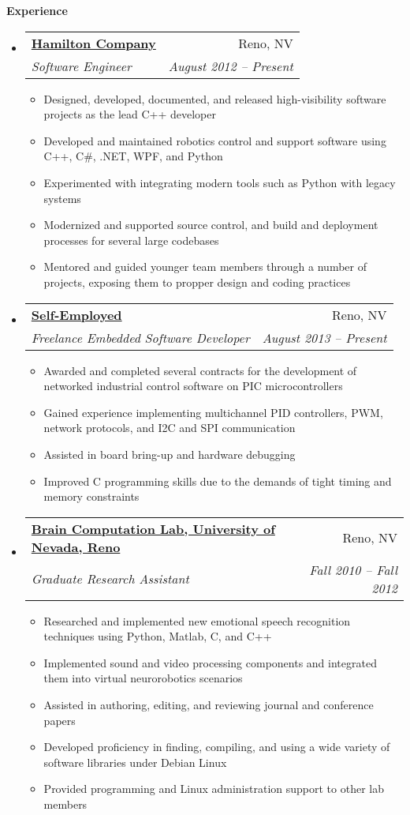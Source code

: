 \documentclass[letterpaper,11pt]{article}
\makeatletter
\newcommand{\resitem}[1]{\item #1 \vspace{-2pt}}
\newcommand{\resheading}[1]{{\large \colorbox{mygrey}{\begin{minipage}{\textwidth}{\textbf{#1 \vphantom{p\^{E}}}}\end{minipage}}}}
\newcommand{\ressubheading}[4]{
\begin{tabular*}{6.5in}{l@{\extracolsep{\fill}}r}
		\textbf{#1} & #2 \\
		\textit{#3} & \textit{#4} \\
\end{tabular*}\vspace{-6pt}}
\makeatother
\begin{document}
\resheading{Experience}
	\begin{itemize}
		\item 
			\ressubheading{\href{http://www.hamiltoncompany.com/}{Hamilton Company}}{Reno, NV}{Software Engineer}{August 2012 -- Present}
				{ \footnotesize
				\begin{itemize}
					\resitem{Designed, developed, documented, and released high-visibility software projects as the lead C++ developer}
					\resitem{Developed and maintained robotics control and support software using C++, C\#, .NET, WPF, and Python}
					\resitem{Experimented with integrating modern tools such as Python with legacy systems}
					\resitem{Modernized and supported source control, and build and deployment processes for several large codebases}
					\resitem{Mentored and guided younger team members through a number of projects, exposing them to propper design and coding practices}					
				\end{itemize}
				}		
				
		\item 
			\ressubheading{\href{https://www.linkedin.com/in/gferneyhough}{Self-Employed}}{Reno, NV}{Freelance Embedded Software Developer}{August 2013 -- Present}
				{ \footnotesize
				\begin{itemize}
					\resitem{Awarded and completed several contracts for the development of networked industrial control software on PIC microcontrollers}
					\resitem{Gained experience implementing multichannel PID controllers, PWM, network protocols, and I2C and SPI communication}
					\resitem{Assisted in board bring-up and hardware debugging}
					\resitem{Improved C programming skills due to the demands of tight timing and memory constraints}
				\end{itemize}
				}
				
		\item 
			\ressubheading{\href{http://www.cse.unr.edu/brain/}{Brain Computation Lab, University of Nevada, Reno}}{Reno, NV}{Graduate Research Assistant}{Fall 2010 -- Fall 2012}
				{ \footnotesize
				\begin{itemize}
					\resitem{Researched and implemented new emotional speech recognition techniques using Python, Matlab, C, and C++}
					\resitem{Implemented sound and video processing components and integrated them into virtual neurorobotics scenarios}
					\resitem{Assisted in authoring, editing, and reviewing journal and conference papers}
					\resitem{Developed proficiency in finding, compiling, and using a wide variety of software libraries under Debian Linux}
					\resitem{Provided programming and Linux administration support to other lab members}
				\end{itemize}
				}
	\end{itemize}  %
\end{document}
